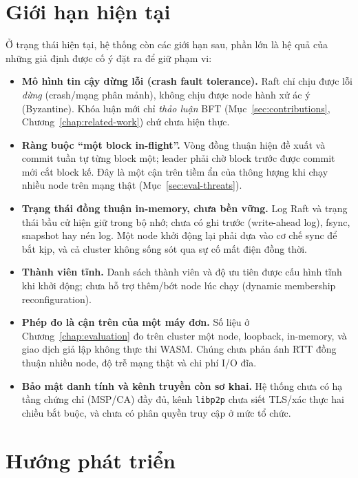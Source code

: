 \section{Giới hạn hiện tại}
\label{sec:limitations}

Ở trạng thái hiện tại, hệ thống còn các giới hạn sau, phần lớn là hệ quả của
những giả định được cố ý đặt ra để giữ phạm vi:

\begin{itemize}
  \item \textbf{Mô hình tin cậy dừng lỗi (crash fault tolerance).} Raft chỉ chịu
  được lỗi \textit{dừng} (crash/mạng phân mảnh), không chịu được node hành xử
  ác ý (Byzantine). Khóa luận mới chỉ \textit{thảo luận} BFT
  (Mục~\ref{sec:contributions}, Chương~\ref{chap:related-work}) chứ chưa hiện
  thực.

  \item \textbf{Ràng buộc ``một block in-flight''.} Vòng đồng thuận hiện đề xuất
  và commit tuần tự từng block một; leader phải chờ block trước được commit mới
  cắt block kế. Đây là một cận trên tiềm ẩn của thông lượng khi chạy nhiều node
  trên mạng thật (Mục~\ref{sec:eval-threats}).

  \item \textbf{Trạng thái đồng thuận in-memory, chưa bền vững.} Log Raft và
  trạng thái bầu cử hiện giữ trong bộ nhớ; chưa có ghi trước (write-ahead log),
  fsync, snapshot hay nén log. Một node khởi động lại phải dựa vào cơ chế sync
  để bắt kịp, và cả cluster không sống sót qua sự cố mất điện đồng thời.

  \item \textbf{Thành viên tĩnh.} Danh sách thành viên và độ ưu tiên được cấu
  hình tĩnh khi khởi động; chưa hỗ trợ thêm/bớt node lúc chạy (dynamic
  membership reconfiguration).

  \item \textbf{Phép đo là cận trên của một máy đơn.} Số liệu ở
  Chương~\ref{chap:evaluation} đo trên cluster một node, loopback, in-memory, và
  giao dịch giả lập không thực thi WASM. Chúng chưa phản ánh RTT đồng thuận nhiều
  node, độ trễ mạng thật và chi phí I/O đĩa.

  \item \textbf{Bảo mật danh tính và kênh truyền còn sơ khai.} Hệ thống chưa có
  hạ tầng chứng chỉ (MSP/CA) đầy đủ, kênh \texttt{libp2p} chưa siết TLS/xác thực
  hai chiều bắt buộc, và chưa có phân quyền truy cập ở mức tổ chức.
\end{itemize}

\section{Hướng phát triển}
\label{sec:future-directions}

